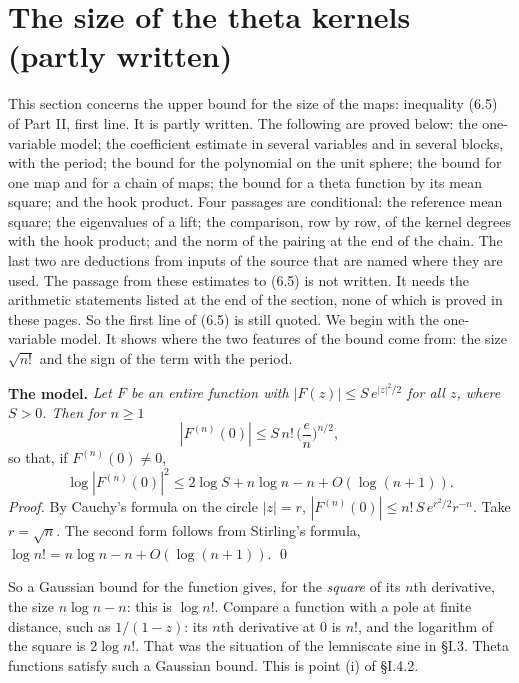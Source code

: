 \documentclass[11pt,letterpaper]{article}
\begin{document}
\section{The size of the theta kernels (partly written)}

This section concerns the upper bound for the size of the maps: inequality (6.5) of Part II, first line.
It is partly written. The following are proved below: the one-variable model; the coefficient estimate in
several variables and in several blocks, with the period; the bound for the polynomial on the unit sphere;
the bound for one map and for a chain of maps; the bound for a theta function by its mean square; and the
hook product. Four passages are conditional: the reference mean square; the eigenvalues of a lift; the
comparison, row by row, of the kernel degrees with the hook product; and the norm of the pairing at the end
of the chain. The last two are deductions from inputs of the source that are named where they are used.
The passage from these estimates to (6.5) is not written. It needs the arithmetic statements listed at the
end of the section, none of which is proved in these pages. So the first line of (6.5) is still quoted.
We begin with the one-variable model. It shows where the two features of the bound come from: the size
$\sqrt{n!}$ and the sign of the term with the period.

\textbf{The model.} \emph{Let $F$ be an entire function with $|F(z)|\le S\,e^{|z|^2/2}$ for all $z$, where $S>0$. Then for
$n\ge1$}
\begin{equation}\label{D:144}
 |F^{(n)}(0)|\le S\,n!\,\Big(\frac en\Big)^{n/2},
\end{equation}
so that, if $F^{(n)}(0)\ne0$,
\begin{equation}\label{D:145}
 \log|F^{(n)}(0)|^2\le2\log S+n\log n-n+O(\log(n+1)).
\end{equation}
\emph{Proof.} By Cauchy's formula on the circle $|z|=r$, $|F^{(n)}(0)|\le n!\,S\,e^{r^2/2}r^{-n}$. Take
$r=\sqrt n$. The second form follows from Stirling's formula, $\log n!=n\log n-n+O(\log(n+1))$. \qed

\noindent So a Gaussian bound for the function gives, for the \emph{square} of its $n$th derivative, the size
$n\log n-n$: this is $\log n!$. Compare a function with a pole at finite distance, such as $1/(1-z)$: its $n$th
derivative at $0$ is $n!$, and the logarithm of the square is $2\log n!$. That was the situation of the
lemniscate sine in \S I.3. Theta functions
satisfy such a Gaussian bound. This is point (i) of \S I.4.2.
\end{document}
